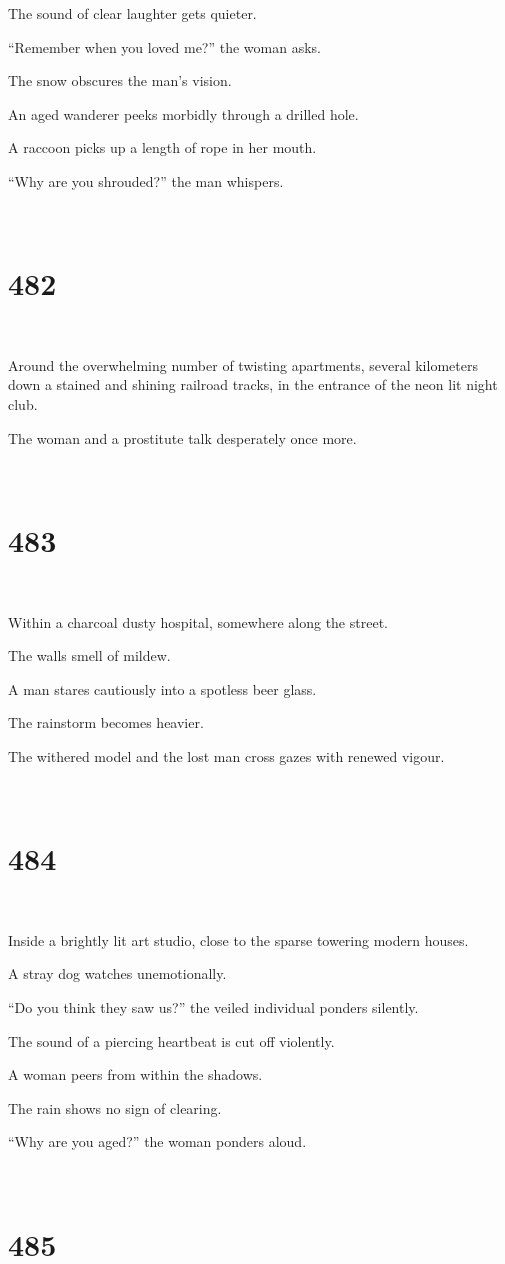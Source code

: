 \documentclass{report}
\begin{document}
The sound of clear laughter gets quieter.

``Remember when you loved me?'' the woman asks.

The snow obscures the man's vision.

An aged wanderer peeks morbidly through a drilled hole.

A raccoon picks up a length of rope in her mouth.

``Why are you shrouded?'' the man whispers.

~
\chapter*{482}
~

Around the overwhelming number of twisting apartments, several kilometers down a stained and shining railroad tracks, in the entrance of the neon lit night club.

The woman and a prostitute talk desperately once more.

~
\chapter*{483}
~

Within a charcoal dusty hospital, somewhere along the street.

The walls smell of mildew.

A man stares cautiously into a spotless beer glass.

The rainstorm becomes heavier.

The withered model and the lost man cross gazes with renewed vigour.

~
\chapter*{484}
~

Inside a brightly lit art studio, close to the sparse towering modern houses.

A stray dog watches unemotionally.

``Do you think they saw us?'' the veiled individual ponders silently.

The sound of a piercing heartbeat is cut off violently.

A woman peers from within the shadows.

The rain shows no sign of clearing.

``Why are you aged?'' the woman ponders aloud.

~
\chapter*{485}
~
\end{document}
